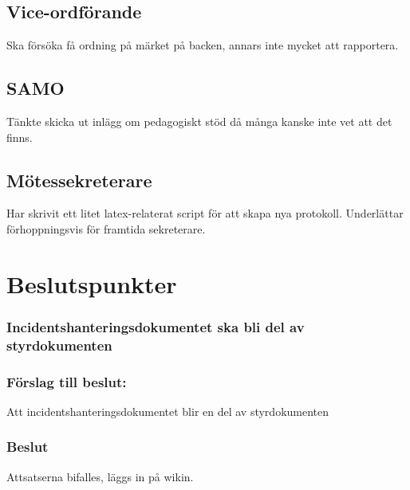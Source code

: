 \documentclass[protokoll]{dvd}
\begin{document}
\subsection{Vice-ordförande}
Ska försöka få ordning på märket på backen, annars inte mycket att rapportera.

\subsection{SAMO}
Tänkte skicka ut inlägg om pedagogiskt stöd då många kanske inte vet att det finns.

\subsection{Mötessekreterare}
Har skrivit ett litet latex-relaterat script för att skapa nya protokoll.
Underlättar förhoppningsvis för framtida sekreterare.

\newpage

\section{Beslutspunkter}

\subsubsection*{Incidentshanteringsdokumentet ska bli del av styrdokumenten}

\subsubsection*{Förslag till beslut:}
\begin{attsatser}
    \item Att incidentshanteringsdokumentet blir en del av styrdokumenten
\end{attsatser}

\subsubsection*{Beslut}
\begin{attsatser}
    \item Attsatserna bifalles, läggs in på wikin.
\end{attsatser}
\end{document}
